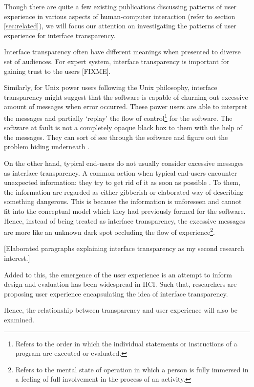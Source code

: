 \documentclass{acm_proc_article-sp}
\begin{document}
Though there are quite a few existing publications discussing patterns
of user experience in various aspects of human-computer interaction
(refer to section \ref{sec:related}), we will focus our attention on
investigating the patterns of user experience for interface
transparency.

Interface transparency often have different meanings when presented to
diverse set of audiences. For expert system, interface transparency is
important for gaining trust to the users [FIXME].

Similarly, for Unix power users following the Unix philosophy,
interface transparency might suggest that the software is capable of
churning out excessive amount of messages when error occurred. These
power users are able to interpret the messages and partially `replay'
the flow of control\footnote{Refers to the order in which the
  individual statements or instructions of a program are executed or
  evaluated.}  for the software. The software at fault is not a
completely opaque black box to them with the help of the
messages. They can sort of see through the software and figure out the
problem hiding underneath \citep{unix:raymond}.

On the other hand, typical end-users do not usually consider excessive
messages as interface transparency. A common action when typical
end-users encounter unexpected information: they try to get rid of it
as soon as possible \citep{oldnew:chen}. To them, the information are
regarded as either gibberish or elaborated way of describing something
dangerous. This is because the information is unforeseen and cannot
fit into the conceptual model which they had previously formed for the
software. Hence, instead of being treated as interface transparency,
the excessive messages are more like an unknown dark spot occluding
the flow of experience\footnote{Refers to the mental state of
  operation in which a person is fully immersed in a feeling of full
  involvement in the process of an activity.}.


[Elaborated paragraphs explaining interface transparency as my second
  research interest.]

Added to this, the emergence of the user experience is an attempt to
inform design and evaluation has been widespread in HCI. Such that,
researchers are proposing user experience encapsulating the idea of
interface transparency.

Hence, the relationship between transparency and user
experience will also be examined.
\end{document}
